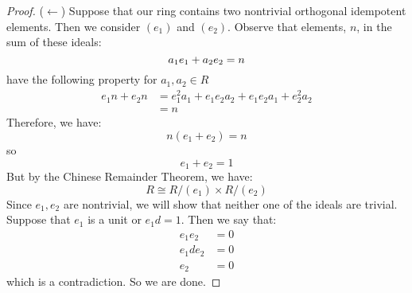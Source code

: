\documentclass{article}
\begin{document}
\begin{proof}
        ($\leftarrow $) Suppose that our ring contains two nontrivial orthogonal idempotent elements. Then we consider $(e_{1})$ and $(e_{2})$. Observe that elements, $n$, in the sum of these ideals:
            \begin{equation*}
                a_{1}e_{1} + a_{2}e_{2} = n \\
            \end{equation*}
        have the following property for $a_{1}, a_{2} \in R$
            \begin{align*}
                e_{1}n + e_{2}n &= e_{1}^{2}a_{1} + e_{1}e_{2}a_{2} + e_{1}e_{2}a_{1} + e_{2}^{2}a_{2} \\
                &= n
            \end{align*}
        Therefore, we have:
            \begin{equation*}
                n(e_{1} + e_{2}) = n
            \end{equation*}
        so 
            \begin{equation*}
                e_{1} + e_{2} = 1
            \end{equation*}
        But by the Chinese Remainder Theorem, we have:
            \begin{equation*}
                R \cong R/(e_{1}) \times R/(e_{2})
            \end{equation*}
        Since $e_{1}, e_{2}$ are nontrivial, we will show that neither one of the ideals are trivial. Suppose that $e_{1}$ is a unit or $e_{1}d = 1$. Then we say that:
            \begin{align*}
                e_{1}e_{2}  &= 0 \\
                e_{1}de_{2} &= 0 \\
                e_{2}       &= 0   
            \end{align*}
        which is a contradiction. So we are done.


\end{proof}
\end{document}
